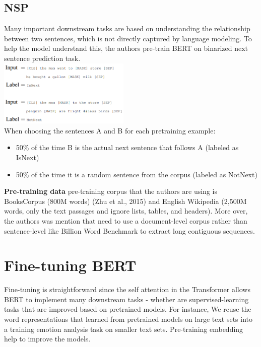 \documentclass[11pt]{article}
\begin{document}
\subsection{NSP}
\label{sect:pdf}
\quad Many important downstream tasks are based on understanding the relationship between two sentences, which is not directly captured by language modeling. To help the model understand this, the authors pre-train BERT on binarized next sentence prediction task. \\

\includegraphics[width=0.47\textwidth]{NSP.png} \\

When choosing the sentences A and B for each pretraining example:
\begin{itemize}
    \item 50\% of the time B is the actual next sentence that follows A (labeled as IsNext)
    \item 50\% of the time it is a random sentence from the corpus (labeled as NotNext)
\end{itemize}

\textbf{Pre-training data} pre-training corpus that the authors are  using is BooksCorpus (800M words) (Zhu et al., 2015) and English Wikipedia (2,500M words, only the text passages and ignore lists, tables, and headers). More over, the authors was mention that need to
use a document-level corpus rather than sentence-level like Billion Word Benchmark to extract long contiguous sequences.

\section{Fine-tuning BERT}

\quad Fine-tuning is straightforward since the self attention in the Transformer allows BERT to implement many downstream tasks - 
whether are supervised-learning tasks that are improved based on pretrained models. For instance, We reuse the word representations that learned from pretrained models on large text sets into a training emotion analysis task on smaller text sets. Pre-training embedding help to improve the models.\cite{devlin2018bert}
\end{document}
